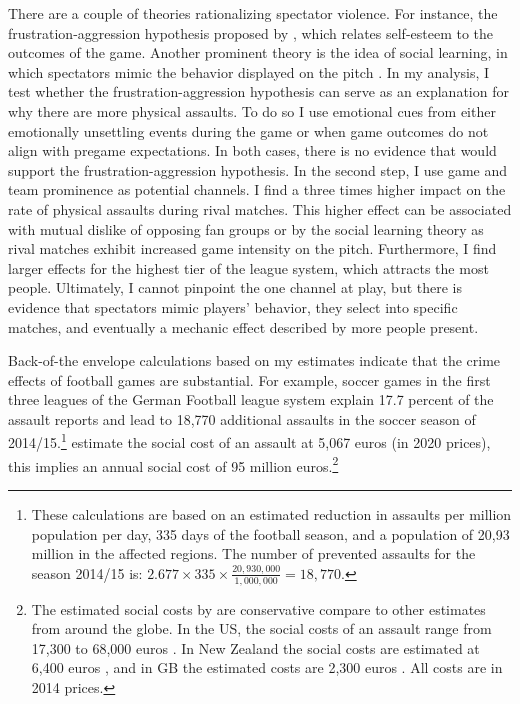 \documentclass[11pt, a4paper]{article} %
\begin{document}
There are a couple of theories rationalizing spectator violence. For instance, the frustration-aggression hypothesis proposed by \cite{dollard1939frustration}, which relates self-esteem to the outcomes of the game. Another prominent theory is the idea of social learning, in which spectators mimic the behavior displayed on the pitch \citep{bandura1973aggression, bandura2007social}. In my analysis, I test whether the frustration-aggression hypothesis can serve as an explanation for why there are more physical assaults. To do so I use emotional cues from either emotionally unsettling events during the game or when game outcomes do not align with pregame expectations. In both cases, there is no evidence that would support the frustration-aggression hypothesis. In the second step, I use game and team prominence as potential channels. I find a three times higher impact on the rate of physical assaults during rival matches. This higher effect can be associated with mutual dislike of opposing fan groups or by the social learning theory as rival matches exhibit increased game intensity on the pitch. Furthermore, I find larger effects for the highest tier of the league system, which attracts the most people. Ultimately, I cannot pinpoint the one channel at play, but there is evidence that spectators mimic players' behavior, they select into specific matches, and eventually a mechanic effect described by more people present. 


				
Back-of-the envelope calculations based on my estimates indicate that the crime effects of football games are substantial. For example, soccer games in the first three leagues of the German Football league system explain 17.7 percent of the assault reports and lead to 18,770 additional assaults in the soccer season of 2014/15.\footnote{These calculations are based on an estimated reduction in assaults per million population per day, 335 days of the football season, and a population of 20,93 million in the affected regions. The number of prevented assaults for the season 2014/15 is: $2.677 \times 335 \times \frac{20,930,000}{1,000,000} = 18,770.$} \cite{glaubitz2016kostet} estimate the social cost of an assault at 5,067 euros (in 2020 prices), this implies an annual social cost of 95 million euros.\footnote{The estimated social costs by \cite{glaubitz2016kostet} are conservative compare to other estimates from around the globe. In the US, the social costs of an assault range from 17,300 to 68,000 euros \citep{miller1996victim,cohen2004willingness}. In New Zealand the social costs are estimated at 6,400 euros \citep{roper2006estimating}, and in GB the estimated costs are 2,300 euros \citep{dubourg2005economic}. All costs are in 2014 prices.}
	
\end{document}
